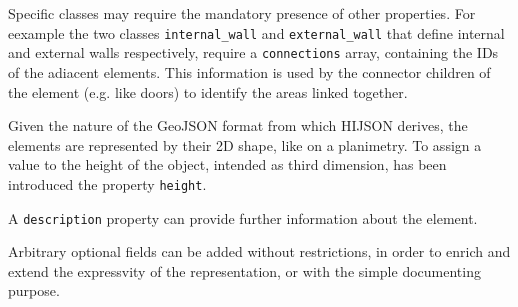 Specific classes may require the mandatory presence of other properties. For
eexample the two classes {\tt internal\_wall} and {\tt external\_wall} that
define internal and external walls respectively, require a {\tt connections}
array, containing the IDs of the adiacent elements. This information is used
by the connector children of the element (e.g. like doors) to identify the
areas linked together.

Given the nature of the GeoJSON format from which HIJSON
derives, the elements are represented by their 2D shape, like on a
planimetry. To assign a value to the height of the object, intended as
third dimension, has been introduced the property {\tt height}.

A {\tt description} property can provide further information about
the element.

Arbitrary optional fields can be added without restrictions, in order to
enrich and extend the expressvity of the representation, or with the simple
documenting purpose.
